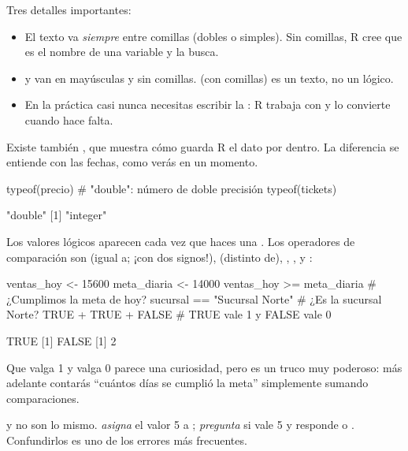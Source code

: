 Tres detalles importantes:

\begin{itemize}
  \item El texto va \emph{siempre} entre comillas (dobles o simples). Sin
        comillas, R cree que  es el nombre de una variable y
        la busca.
  \item {} y  van en mayúsculas y sin comillas.
         (con comillas) es un texto, no un lógico.
  \item En la práctica casi nunca necesitas escribir la : R
        trabaja con  y lo convierte cuando hace falta.
\end{itemize}

Existe también , que muestra cómo guarda R el dato por
dentro. La diferencia se entiende con las fechas, como verás en un momento.

\begin{rcode}
typeof(precio)      # "double": número de doble precisión
typeof(tickets)
\end{rcode}
\begin{rsalida}
[1] "double"
[1] "integer"
\end{rsalida}

Los valores lógicos aparecen cada vez que haces una
. Los operadores de comparación son \codigo{==}
(igual a; ¡con dos signos!), \codigo{!=} (distinto de), \codigo{>},
\codigo{<}, \codigo{>=} y \codigo{<=}:

\begin{rcode}
ventas_hoy <- 15600
meta_diaria <- 14000
ventas_hoy >= meta_diaria          # ¿Cumplimos la meta de hoy?
sucursal == "Sucursal Norte"       # ¿Es la sucursal Norte?
TRUE + TRUE + FALSE                # TRUE vale 1 y FALSE vale 0
\end{rcode}
\begin{rsalida}
[1] TRUE
[1] FALSE
[1] 2
\end{rsalida}

Que  valga 1 y  valga 0 parece una curiosidad,
pero es un truco muy poderoso: más adelante contarás ``cuántos días se
cumplió la meta'' simplemente sumando comparaciones.

\begin{advertencia}
\codigo{=} y \codigo{==} no son lo mismo.  \emph{asigna} el
valor 5 a ;  \emph{pregunta} si  vale 5 y
responde  o . Confundirlos es uno de los errores
más frecuentes.
\end{advertencia}

